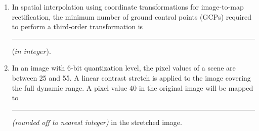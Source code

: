 \documentclass[12pt]{article}
\begin{document}
\begin{enumerate}
\item In spatial interpolation using coordinate transformations for image-to-map
rectification, the minimum number of ground control points (GCPs) required to
perform a third-order transformation is \rule{2cm}{0.15mm}($in$ $integer$). 

\item In an image with 6-bit quantization level, the pixel values of a scene are between 25
and 55. A linear contrast stretch is applied to the image covering the full dynamic
range. A pixel value 40 in the original image will be mapped to \rule{2cm}{0.15mm} \textit{(rounded off to nearest integer)} in the stretched image.







\end{enumerate}
\end{document}
